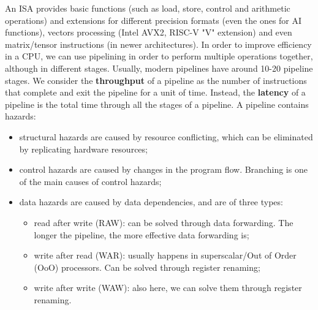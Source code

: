 An ISA provides basic functions (such as load, store, control and arithmetic operations) and extensions for different precision formats (even the ones for AI functions), vectors processing (Intel AVX2, RISC-V "V" extension) and even matrix/tensor instructions (in newer architectures).
\nwl
In order to improve efficiency in a CPU, we can use pipelining in order to perform multiple operations together, although in different stages. Usually, modern pipelines have around 10-20 pipeline stages.
\nwl
We consider the \textbf{throughput} of a pipeline as the number of instructions that complete and exit the pipeline for a unit of time. Instead, the \textbf{latency} of a pipeline is the total time through all the stages of a pipeline.
\nwl
A pipeline contains hazards:
\begin{itemize}
    \item structural hazards are caused by resource conflicting, which can be eliminated by replicating hardware resources;
    \item control hazards are caused by changes in the program flow. Branching is one of the main causes of control hazards;
    \item data hazards are caused by data dependencies, and are of three types:
    \begin{itemize}
        \item read after write (RAW): can be solved through data forwarding. The longer the pipeline, the more effective data forwarding is;
        \item write after read (WAR): usually happens in superscalar/Out of Order (OoO) processors. Can be solved through register renaming;
        \item write after write (WAW): also here, we can solve them through register renaming.
    \end{itemize}
\end{itemize} 

